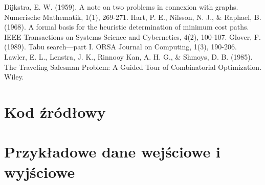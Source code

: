 \documentclass[12pt,a4paper]{article}
\begin{document}
\begin{thebibliography}{9}
     Dijkstra, E. W. (1959). A note on two problems in connexion with graphs. Numerische Mathematik, 1(1), 269-271.
     Hart, P. E., Nilsson, N. J., & Raphael, B. (1968). A formal basis for the heuristic determination of minimum cost paths. IEEE Transactions on Systems Science and Cybernetics, 4(2), 100-107.
     Glover, F. (1989). Tabu search—part I. ORSA Journal on Computing, 1(3), 190-206.
     Lawler, E. L., Lenstra, J. K., Rinnooy Kan, A. H. G., & Shmoys, D. B. (1985). The Traveling Salesman Problem: A Guided Tour of Combinatorial Optimization. Wiley.
\end{thebibliography}

\appendix
\section{Kod źródłowy}

\section{Przykładowe dane wejściowe i wyjściowe}
\end{document}
